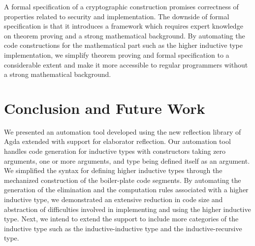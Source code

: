 \documentclass[sigplan,10pt]{acmart}
\begin{document}
A formal specification of a cryptographic construction promises correctness of properties related to security and implementation. The downside of formal specification is that it introduces a framework which requires expert knowledge on theorem proving and a strong mathematical background. By automating the code constructions for the mathematical part such as the higher inductive type implementation, we simplify theorem proving and formal specification to a considerable extent and make it more accessible to regular programmers without a strong mathematical background.

\section{Conclusion and Future Work}
We presented an automation tool developed using the new reflection library of Agda extended with support for elaborator reflection. Our automation tool handles code generation for inductive types with constructors taking zero arguments, one or more arguments, and type being defined itself as an argument. We simplified the syntax for defining higher inductive types through the mechanized construction of the boiler-plate code segments. By automating the generation of the elimination and the computation rules associated with a higher inductive type, we demonstrated an extensive reduction in code size and abstraction of difficulties involved in implementing and using the higher inductive type. Next, we intend to extend the support to include more categories of the inductive type such as the inductive-inductive type and the inductive-recursive type.



 
\end{document}

